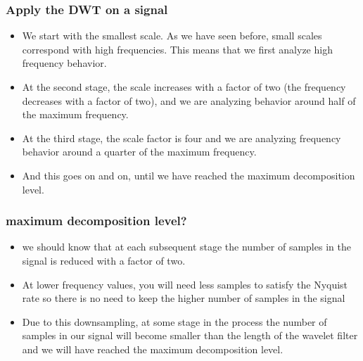 \documentclass{beamer}
\begin{document}
\begin{frame}
	\frametitle{Apply the DWT on a signal}
	
	\begin{itemize}
		\item
		We start with the smallest scale. As we have seen before, small scales correspond with high frequencies. This means that we first analyze high frequency behavior. 
		
		\item
		At the second stage, the scale increases with a factor of two (the frequency decreases with a factor of two), and we are analyzing behavior around half of the maximum frequency.
		
		\item
		
		At the third stage, the scale factor is four and we are analyzing frequency behavior around a quarter of the maximum frequency.
		
		\item
		
		And this goes on and on, until we have reached the maximum decomposition level.
	\end{itemize}
	
\end{frame}


\begin{frame}
	\frametitle{maximum decomposition level?}
	
	\begin{itemize}
		\item 
		we should  know that at each subsequent stage the number of samples in the signal is reduced with a factor of two. 
		
		\item
		
		At lower frequency values, you will need less samples to satisfy the Nyquist rate so there is no need to keep the higher number of samples in the signal
		
		\item
		
		Due to this downsampling, at some stage in the process the number of samples in our signal will become smaller than the length of the wavelet filter and we will have reached the maximum decomposition level.
		
	\end{itemize}
	
\end{frame}
\end{document}
